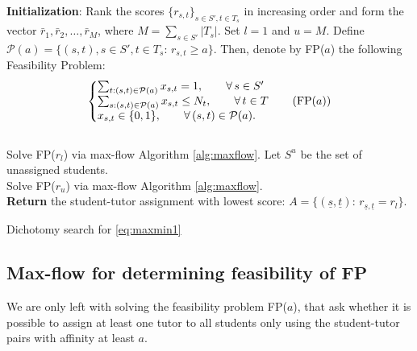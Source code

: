 \documentclass[11pt,oneside,a4paper]{article}     %
\makeatletter
\newenvironment{sistema}%
{\left\lbrace\begin{array}{@{}l@{}}}%
{\end{array}\right.}
\makeatother
\begin{document}
\begin{algorithm}[H]
\textbf{Initialization}: Rank the scores $\{r_{s,t}\}_{s\in S',t\in T_s}$ in increasing order and form the vector $\bar r_1,\bar r_2,\dots,\bar r_M$, where $M=\sum_{s\in S'}|T_s|$. Set $l=1$ and $u=M$. Define $\mathcal P(a)=\{(s,t), s\in S',t\in T_s: \, r_{s,t}\ge a\}$. Then, denote by FP($a$) the following Feasibility Problem:
\begin{equation} \label{eq:setcover2}
\begin{sistema}
\sum_{t:(s,t)\in \mathcal P(a)} x_{s,t}= 1, \qquad \forall \, s\in S' \\
\sum_{s:(s,t)\in \mathcal P(a)} x_{s,t} \le N_t, \qquad \forall\, t\in T \\
x_{s,t}\in \{0,1\}, \qquad \forall\, (s,t)\in \mathcal P(a).
\end{sistema} \tag{FP($a$)}
\end{equation}\\
Solve FP($r_l$) via max-flow Algorithm \ref{alg:maxflow}. Let $S^u$ be the set of unassigned students.\\
Solve FP($r_u$) via max-flow Algorithm \ref{alg:maxflow}.\\
\textbf{Return} the student-tutor assignment with lowest score: $A=\{(\underline{s},\underline{t}): \, r_{\underline{s},\underline{t}}=r_l\}$.
\caption{Dichotomy search for \ref{eq:maxmin1}}
\label{alg:dichot}
\end{algorithm}


\subsection{Max-flow for determining feasibility of FP}


We are only left with solving the feasibility problem FP($a$), that ask whether it is possible to assign at least one tutor to all students only using the student-tutor pairs with affinity at least $a$.
\end{document}
